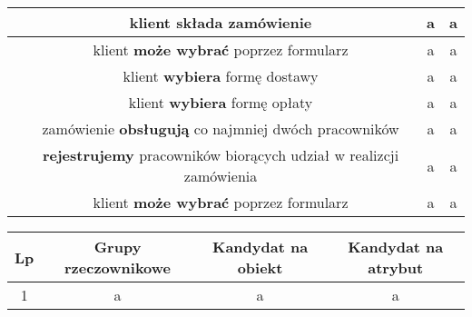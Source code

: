 \documentclass[a4page]{article}
\begin{document}
\begin{table}
\begin{adjustwidth}{-3cm}{}
\begin{tabular}{|c|c|c|c|}
				\hline
					\next & klient \textbf{składa} zamówienie & a & a\\
				\hline
					\next & klient \textbf{może wybrać} poprzez formularz & a & a\\
				\hline
					\next & klient \textbf{wybiera} formę dostawy & a & a\\
				\hline
					\next & klient \textbf{wybiera} formę opłaty & a & a\\
				\hline
					\next & zamówienie \textbf{obsługują} co najmniej dwóch pracowników & a & a\\
				\hline
					\next & \textbf{rejestrujemy} pracowników biorących udział w realizcji zamówienia & a & a\\
				\hline
					\next & klient \textbf{może wybrać} poprzez formularz & a & a\\
				\hline
	
			\end{tabular}
		\end{adjustwidth}
	\end{table}

	\newpage

	\begin{table}
		\large

		\begin{tabular}{|c|c|c|c|}
		
			\hline
				Lp & Grupy rzeczownikowe & Kandydat na obiekt & Kandydat na atrybut\\
			\hline
				1 & a & a & a\\
			\hline

		\end{tabular}
	\end{table}
\end{document}
